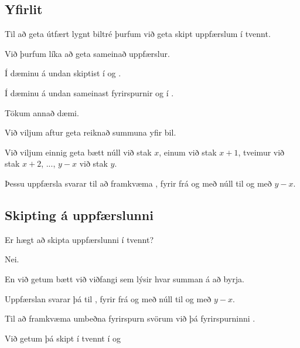 \subsection{Yfirlit}
{
	{
		\item<1-> Til að geta útfært lygnt biltré þurfum við geta skipt uppfærslum í tvennt.
		\item<2-> Við þurfum líka að geta sameinað uppfærslur.
		\item<3-> Í dæminu á undan skiptist  í  og .
		\item<4-> Í dæminu á undan sameinast fyrirspurnir  og  í .
		\item<5-> Tökum annað dæmi.
		\item<6-> Við viljum aftur geta reiknað summuna yfir bil.
		\item<7-> Við viljum einnig geta bætt núll við stak $x$, einum við stak $x + 1$, tveimur við stak $x + 2$, ..., $y - x$ við stak $y$.
		\item<8-> Þessu uppfærsla svarar til að framkvæma , fyrir  frá og með núll til og með $y - x$.
	}
}

\subsection{Skipting á uppfærslunni}
{
	{
		\item<1-> Er hægt að skipta uppfærslunni  í tvennt?
		\item<2-> Nei.
		\item<3-> En við getum bætt við viðfangi sem lýsir hvar summan á að byrja.
		\item<4-> Uppfærslan  svarar þá til , fyrir  frá og með núll til og með $y - x$.
		\item<5-> Til að framkvæma umbeðna fyrirspurn svörum við þá fyrirspurninni .
		\item<6-> Við getum þá skipt  í tvennt í  og 
	}
}

